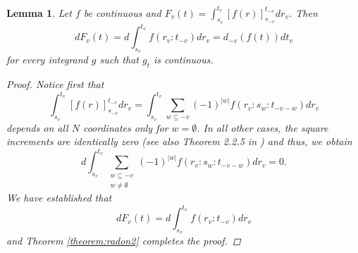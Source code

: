 \documentclass[english, a4paper, 12pt,reqno]{amsart}
\newtheorem{lemma}[defi]{Lemma}
\begin{document}
\begin{lemma}
\label{lemma:fundamental2}
    Let $f$ be continuous and $F_v(t) = \int_{s_v}^{t_v} [f(r)] _{s_{-v}}^{t_{-v}}dr_v$. Then 
    $$dF_v(t) = d\int_{s_v}^{t_v} f(r_v:t_{-v}) dr_v = d_{-v}(f(t))dt_v$$
    for every integrand $g$ such that $g_t$ is continuous.
    \begin{proof}
    Notice first that
    $$\int_{s_v}^{t_v} [f(r)] _{s_{-v}}^{t_{-v}}dr_v =\int_{s_v}^{t_v} \sum_{w\subseteq -v} (-1)^{|w|} f(r_v:s_w:t_{-v-w}) dr_v $$ 
    depends on all $N$ coordinates only for $w=\emptyset$. In all other cases, the square increments are identically zero (see also Theorem 2.2.5 in \cite{prause2015sequential}) and thus, we obtain
    $$d\int_{s_v}^{t_v} \sum_{\substack{{w\subseteq -v}\\ w\neq\emptyset}} (-1)^{|w|} f(r_v:s_w:t_{-v-w}) dr_v=0.$$
    We have established that $$dF_v(t) = d\int_{s_v}^{t_v} f(r_v:t_{-v}) dr_v$$
    and Theorem \ref{theorem:radon2} completes the proof.
    

\end{proof}
\end{lemma}
\end{document}
